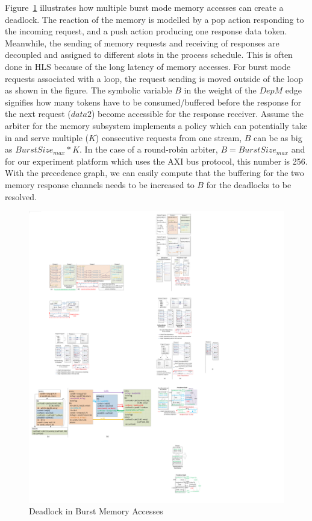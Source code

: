 \documentclass{sig-alternate}
\begin{document}
Figure~\ref{fig:memBurst} illustrates how multiple burst mode memory accesses can
create a deadlock. The reaction of the memory is modelled by a pop action
responding to the incoming request, and a push action producing one response data token. Meanwhile, the sending of memory requests and receiving of responses are decoupled and assigned to different slots in the process schedule. This is often done in HLS because of the long latency of memory accesses.
For burst mode requests associated with a loop, the request sending is moved outside of the loop as shown in the figure. The symbolic variable $B$ in the weight of the $DepM$ edge signifies how many tokens have to be consumed/buffered before the response for the next request ($data2$) become accessible for the response receiver. Assume the arbiter for the memory subsystem implements a policy which can potentially take in and serve multiple ($K$) consecutive requests from one stream, $B$ can be as big as $BurstSize_{max}*K$. 
In the case of a round-robin arbiter, $B = BurstSize_{max}$ and for our experiment platform which uses the AXI bus protocol, this number is 256. With the precedence graph, we can easily compute that the buffering for the two memory response channels needs to be increased to $B$ for the deadlocks to be resolved.
\begin{figure}[htp]
\begin{center}
\includegraphics[width=1.05\linewidth]{fig/burstMem.pdf}
\caption{Deadlock in Burst Memory Accesses
\label{fig:memBurst}}
\end{center}
\vspace{-3.0em}
\end{figure}
\end{document}
